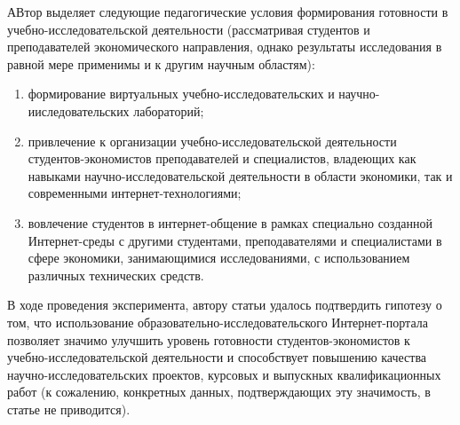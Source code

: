 \documentclass[oneside]{scrartcl}
\begin{document}
АВтор выделяет следующие педагогические условия формирования готовности в учебно-исследовательской деятельности (рассматривая студентов и преподавателей экономического
направления, однако результаты исследования в равной мере применимы и к другим научным областям):
\begin{enumerate}[1)]
	\item формирование виртуальных учебно-исследовательских и научно-ииследовательских лабораторий;
	\item привлечение к организации учебно-исследовательской деятельности студентов-экономистов преподавателей и специалистов, владеющих как навыками научно-исследовательской 
	деятельности в области экономики, так и современными интернет-технологиями;
	\item вовлечение студентов в интернет-общение в рамках специально созданной Интернет-среды с другими студентами, преподавателями и специалистами в сфере экономики, занимающимися исследованиями, с использованием различных технических средств.
\end{enumerate}

В ходе проведения эксперимента, автору статьи удалось подтвердить гипотезу о том, что использование образовательно-исследовательского Интернет-портала позволяет значимо
улучшить уровень готовности студентов-экономистов к учебно-исследовательской деятельности и способствует повышению качества научно-исследовательских проектов, курсовых 
и выпускных квалификационных работ (к сожалению, конкретных данных, подтверждающих эту значимость, в статье не приводится).

\printbibliography
\end{document}
